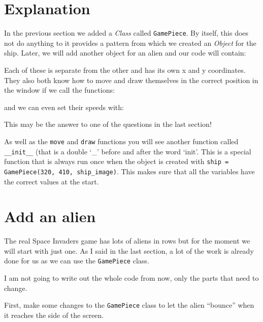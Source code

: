 \documentclass{article}
\newcommand{\pythonscript}[2]{
\begin{itemize}
\item[]
\end{itemize}
}
\newenvironment{hint}{
  \begin{tcolorbox}[colback=green!5,colframe=green!40!black,title=Note]}
{\end{tcolorbox}}
\begin{document}

\section{Explanation}

In the previous section we added a \emph{Class} called \texttt{GamePiece}.
By itself, this does not do anything to it provides a pattern from which
we created an \emph{Object} for the ship. Later, we will add another object
for an alien and our code will contain:


Each of these is separate from the other and has its own x and y coordinates.
They also both know how to move and draw themselves in the correct position
in the window if we call the functions:


and we can even set their speeds with:


\begin{hint}
This may be the answer to one of the questions in the last section!
\end{hint}

As well as the \texttt{move} and \texttt{draw} functions you will see another
function called \texttt{\_\_init\_\_} (that is a double `\_' before and after
the word `init'. This is a special function that is always run once when the
object is created with \texttt{ship = GamePiece(320, 410, ship\_image)}.
This makes sure that all the variables have the correct values at the start.

\section{Add an alien}

The real Space Invaders game has lots of aliens in rows but for the moment we
will start with just one. As I said in the last section, a lot of the work is
already done for us as we can use the \texttt{GamePiece} class.

\begin{hint}
I am not going to write out the whole code from now, only the parts that need
to change.
\end{hint}

First, make some changes to the \texttt{GamePiece} class to let the alien
``bounce'' when it reaches the side of the screen.
\end{document}
